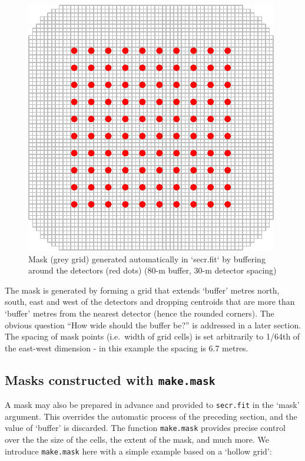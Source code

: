 \documentclass[
]{book}
\begin{document}
\begin{figure}

{\centering \includegraphics{SECRbook_files/figure-latex/bufferplot-1} 

}

\caption{ Mask (grey grid) generated automatically in `secr.fit` by buffering around the detectors (red dots) (80-m buffer, 30-m detector spacing)}\label{fig:bufferplot}
\end{figure}

The mask is generated by forming a grid that extends `buffer' metres north, south, east and west of the detectors and dropping centroids that are more than `buffer' metres from the nearest detector (hence the rounded corners). The obvious question ``How wide should the buffer be?'' is addressed in a later section. The spacing of mask points (i.e.~width of grid cells) is set arbitrarily to 1/64th of the east-west dimension - in this example the spacing is 6.7 metres.

\subsection{\texorpdfstring{Masks constructed with \texttt{make.mask}}{Masks constructed with make.mask}}\label{masks-constructed-with-make.mask}

A mask may also be prepared in advance and provided to \texttt{secr.fit} in the `mask' argument. This overrides the automatic process of the preceding section, and the value of `buffer' is discarded. The function \texttt{make.mask} provides precise control over the the size of the cells, the extent of the mask, and much more. We introduce \texttt{make.mask} here with a simple example based on a `hollow grid':
\end{document}

